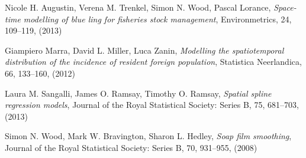 \documentclass[a4paper,11pt,twoside,openright]{book}							%
\begin{document}
\begin{thebibliography}{9}

Nicole H. Augustin, Verena M. Trenkel, Simon N. Wood, Pascal Lorance, \emph{Space-time modelling of blue ling for fisheries stock management}, Environmetrics, 24, 109–119, (2013)

Giampiero Marra, David L. Miller, Luca Zanin, \emph{Modelling the spatiotemporal distribution of the incidence of resident foreign population}, Statistica Neerlandica, 66, 133–160, (2012)

Laura M. Sangalli, James O. Ramsay, Timothy O. Ramsay, \emph{Spatial spline regression models}, Journal of the Royal Statistical Society: Series B, 75, 681–703, (2013)

Simon N. Wood, Mark W. Bravington, Sharon L. Hedley, \emph{Soap film smoothing}, Journal of the Royal Statistical Society: Series B, 70, 931–955, (2008)



\end{thebibliography}
\end{document}

